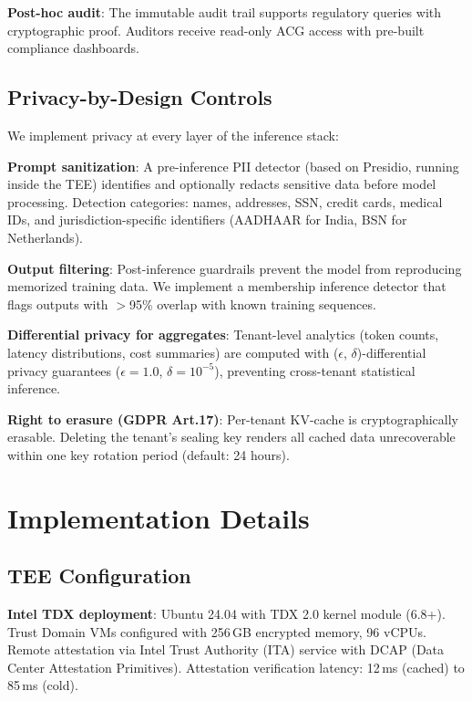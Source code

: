 \documentclass[conference,10pt]{IEEEtran}
\begin{document}
\textbf{Post-hoc audit}: The immutable audit trail supports regulatory queries with cryptographic proof. Auditors receive read-only ACG access with pre-built compliance dashboards.

\subsection{Privacy-by-Design Controls}

We implement privacy at every layer of the inference stack:

\textbf{Prompt sanitization}: A pre-inference PII detector (based on Presidio, running inside the TEE) identifies and optionally redacts sensitive data before model processing. Detection categories: names, addresses, SSN, credit cards, medical IDs, and jurisdiction-specific identifiers (AADHAAR for India, BSN for Netherlands).

\textbf{Output filtering}: Post-inference guardrails prevent the model from reproducing memorized training data. We implement a membership inference detector that flags outputs with $>$95\% overlap with known training sequences.

\textbf{Differential privacy for aggregates}: Tenant-level analytics (token counts, latency distributions, cost summaries) are computed with ($\epsilon$, $\delta$)-differential privacy guarantees ($\epsilon = 1.0$, $\delta = 10^{-5}$), preventing cross-tenant statistical inference.

\textbf{Right to erasure (GDPR Art.17)}: Per-tenant KV-cache is cryptographically erasable. Deleting the tenant's sealing key renders all cached data unrecoverable within one key rotation period (default: 24 hours).

\section{Implementation Details}
\label{sec:impl}

\subsection{TEE Configuration}

\textbf{Intel TDX deployment}: Ubuntu 24.04 with TDX 2.0 kernel module (6.8+). Trust Domain VMs configured with 256\,GB encrypted memory, 96 vCPUs. Remote attestation via Intel Trust Authority (ITA) service with DCAP (Data Center Attestation Primitives). Attestation verification latency: 12\,ms (cached) to 85\,ms (cold).
\end{document}
